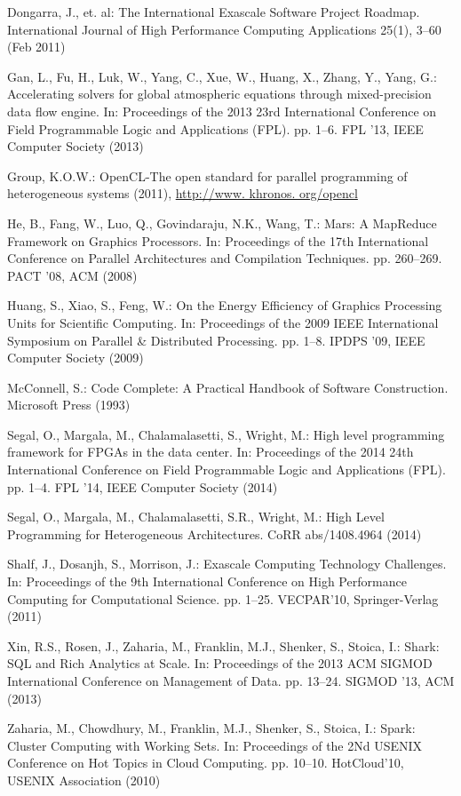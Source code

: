 \documentclass[runningheads,a4paper]{llncs}
\begin{document}
\begin{thebibliography}{22}
Dongarra, J., et. al: {The International Exascale Software Project Roadmap}.
\newblock International Journal of High Performance Computing Applications 25(1), 3--60 (Feb 2011)

Gan, L., Fu, H., Luk, W., Yang, C., Xue, W., Huang, X., Zhang, Y., Yang, G.:
  {Accelerating solvers for global atmospheric equations through
  mixed-precision data flow engine}.
\newblock In: Proceedings of the 2013 23rd International Conference on Field
  Programmable Logic and Applications (FPL). pp. 1--6. FPL '13, IEEE Computer
  Society (2013)

Group, K.O.W.: {OpenCL-The open standard for parallel programming of
  heterogeneous systems} (2011), \urlprefix\url{http://www. khronos.
  org/opencl}

He, B., Fang, W., Luo, Q., Govindaraju, N.K., Wang, T.: {Mars: A MapReduce
  Framework on Graphics Processors}.
\newblock In: Proceedings of the 17th International Conference on Parallel
  Architectures and Compilation Techniques. pp. 260--269. PACT '08, ACM (2008)

Huang, S., Xiao, S., Feng, W.: {On the Energy Efficiency of Graphics Processing
  Units for Scientific Computing}.
\newblock In: Proceedings of the 2009 IEEE International Symposium on Parallel \& Distributed Processing. pp. 1--8. IPDPS '09, IEEE Computer Society (2009)

McConnell, S.: {Code Complete: A Practical Handbook of Software Construction}.
\newblock Microsoft Press (1993)

Segal, O., Margala, M., Chalamalasetti, S., Wright, M.: {High level programming
  framework for FPGAs in the data center}.
\newblock In: Proceedings of the 2014 24th International Conference on Field
  Programmable Logic and Applications (FPL). pp. 1--4. FPL '14, IEEE Computer
  Society (2014)

Segal, O., Margala, M., Chalamalasetti, S.R., Wright, M.: {High Level
  Programming for Heterogeneous Architectures}.
\newblock CoRR abs/1408.4964 (2014)

Shalf, J., Dosanjh, S., Morrison, J.: {Exascale Computing Technology
  Challenges}.
\newblock In: Proceedings of the 9th International Conference on High
  Performance Computing for Computational Science. pp. 1--25. VECPAR'10,
  Springer-Verlag (2011)

Xin, R.S., Rosen, J., Zaharia, M., Franklin, M.J., Shenker, S., Stoica, I.: {Shark: SQL and Rich Analytics at Scale}. In: Proceedings of the 2013 ACM SIGMOD International Conference on Management of Data. pp. 13–24. SIGMOD ’13, ACM (2013)

Zaharia, M., Chowdhury, M., Franklin, M.J., Shenker, S., Stoica, I.: {Spark:
  Cluster Computing with Working Sets}.
\newblock In: Proceedings of the 2Nd USENIX Conference on Hot Topics in Cloud
  Computing. pp. 10--10. HotCloud'10, USENIX Association (2010)
\end{thebibliography}
\end{document}
